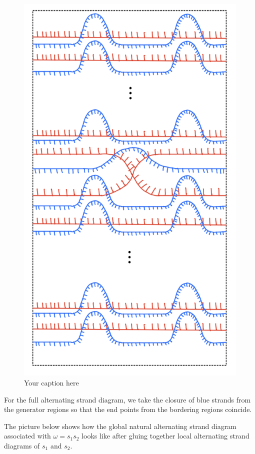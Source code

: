 \begin{figure}[H] 
    \centering
    \includegraphics[scale = 0.95]{diagrams/natural_alternating_diagrams/9.png}
    \caption{Your caption here}
    \label{fig:your-label}
\end{figure}

For the full alternating strand diagram, we take the closure of blue strands from the generator regions so that the end points from the bordering regions coincide.

The picture below shows how the global natural alternating strand diagram associated with $\omega = s_1 s_2$ looks like after gluing together local alternating strand diagrams of $s_1$ and $s_2$.

